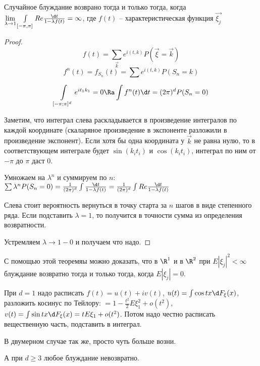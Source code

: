 \begin{theorem}

Случайное блуждание возврано тогда и только тогда, когда $\lim\limits_{\lambda \to 1} \int\limits_{[-\pi, \pi]} Re \frac{\d t}{1 - \lambda f(t)} = \infty$,
где $f(t)$ -- характеристическая функция $\overrightarrow{\xi_j}$
\end{theorem}
\begin{proof}
$$f(t) = \sum\limits_{\overrightarrow{k}} e^{i (t, k)} P(\overrightarrow{\xi} = \overrightarrow{k})$$
$$f^n(t) = f_{S_n}(t) = \sum e^{i (t, k)} P(S_n = k)$$

$$\int\limits_{[-\pi; \pi]^d} e^{i t_1 k_1} = 0 \Ra \int f^n(t) \d t = (2\pi)^d P(S_n = 0)$$

Заметим, что интеграл слева раскладывается в произведение интегралов по каждой координате (скаларяное произведение в экспоненте разложили в произведение экспонент).
Если хотя бы одна координата у $\overrightarrow{k}$ не равна нулю, то в соответствующем интеграле будет $\sin (k_i t_i)$ и $\cos (k_i t_i)$, интеграл по ним от $-\pi$ до $\pi$ даст 0.

Умножаем на $\lambda^n$ и суммируем по $n$: $\sum \lambda^n P(S_n = 0) = \frac{1}{(2\pi)^d} \int \frac{\d t}{1 - \lambda f(t)} = \frac{1}{(2\pi)^d} \int Re \frac{\d t}{1 - \lambda f(t)}$

Слева стоит вероятность вернуться в точку старта за $n$ шагов в виде степенного ряда. Если подставить $\lambda = 1$, то получится в точности сумма из определения возвратности.

Устремляем $\lambda \to 1 - 0$ и получаем что надо.
\end{proof}
\begin{Rem}
С помощью этой теоремяы можно доказать, что в $\R^1$ и в $\R^2$ при $E |\xi_j|^2 < \infty$ блуждание возвратно тогда и только тогда, когда $E |\xi_j| = 0$.

При $d=1$ надо расписать $f(t) = u(t) + iv(t)$, $u(t) = \int \cos tx \d F_\xi(x)$, разложить косинус по Тейлору: $= 1 - \frac{t^2}{2} E\xi_1^2 + o(t^2)$,
$v(t) = \int \sin tx \d F_\xi(x) = t E\xi_1 + o(t^2)$. Потом надо честно расписать вещественную часть, подставить в интеграл.

В двумерном случае так же, просто чуть больше возни.

А при $d \geq 3$ любое блуждание невозвратно.
\end{Rem}

